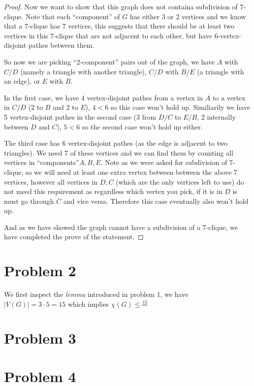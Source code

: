 \documentclass[11pt]{article}
\begin{document}
\begin{proof}
Now we want to show that this graph does not containa subdivision of 7-clique. Note that each ``component'' of $G$ has either 3 or 2 vertices and we know that a 7-clique has 7 vertices, this suggests that there should be at least two vertices in this 7-clique that are not adjacent to each other, but have 6-vertex-disjoint pathes between them.\newline

So now we are picking ``2-component'' pairs out of the graph, we have $A$ with $C/D$ (namely a triangle with another triangle), $C/D$ with $B/E$ (a triangle with an edge), or $E$ with $B$.

In the first case, we have 4 vertex-disjoint pathes from a vertex in $A$ to a vertex in $C/D$ (2 to $B$ and 2 to $E$), $4 < 6$ so this case won't hold up. Similiarily we have 5 vertex-disjoint pathes in the second case (3 from $D/C$ to $E/B$, 2 internally between $D$ and $C$), $5 < 6$ so the second case won't hold up either.

The third case has 6 vertex-disjoint pathes (as the edge is adjacent to two triangles). We need 7 of these vertices and we can find them by counting all vertices in ``components''$A, B, E$. Note as we were asked for subdivision of 7-clique, so we will need at least one extra vertex between between the above 7 vertices, however all vertices in $D, C$ (which are the only vertices left to use) do not meed this requirement as regardless which vertex you pick, if it is in $D$ is must go through $C$ and vice versa. Therefore this case eventually also won't hold up. \newline

And as we have showed the graph cannot have a subdivision of a 7-clique, we have completed the prove of the statement.

\end{proof}

\section*{Problem 2}

We first inspect the \textit{lemma} introduced in problem 1, we have $|V(G)| = 3 \cdot 5 = 15$ which implies $\chi(G) \leq \frac{15}{}$

\section*{Problem 3}

\section*{Problem 4}



%
% 
% 
\end{document}
